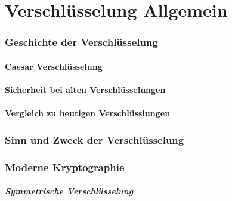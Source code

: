 \part{Verschlüsselung Allgemein}
\section{Geschichte der Verschlüsselung}
\subsection{Caesar Verschlüsselung}
\subsection{Sicherheit bei alten Verschlüsselungen}
\subsection{Vergleich zu heutigen Verschlüsslungen}

\section{Sinn und Zweck der Verschlüsselung}

\section{Moderne Kryptographie}

\subsubsection{Symmetrische Verschlüsselung}
